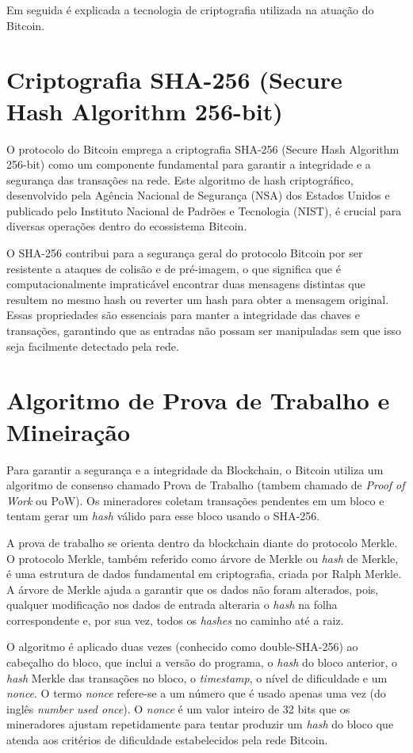 Em seguida é explicada a tecnologia de criptografia utilizada na atuação do Bitcoin.

\section*{Criptografia SHA-256 (Secure Hash Algorithm 256-bit)} \label{subsec:sha256}
O protocolo do Bitcoin emprega a criptografia SHA-256 (Secure Hash Algorithm 256-bit) como um componente fundamental para garantir a integridade e a segurança das transações na rede. Este algoritmo de hash criptográfico, desenvolvido pela Agência Nacional de Segurança (NSA) dos Estados Unidos e publicado pelo Instituto Nacional de Padrões e Tecnologia (NIST), é crucial para diversas operações dentro do ecossistema Bitcoin. 

O SHA-256 contribui para a segurança geral do protocolo Bitcoin por ser resistente a ataques de colisão e de pré-imagem, o que significa que é computacionalmente impraticável encontrar duas mensagens distintas que resultem no mesmo hash ou reverter um hash para obter a mensagem original. Essas propriedades são essenciais para manter a integridade das chaves e transações, garantindo que as entradas não possam ser manipuladas sem que isso seja facilmente detectado pela rede.

\section*{Algoritmo de Prova de Trabalho e Mineiração} \label{subsec:pow}
Para garantir a segurança e a integridade da Blockchain, o Bitcoin utiliza um algoritmo de consenso chamado Prova de Trabalho (tambem chamado de \textit{Proof of Work} ou PoW). Os mineradores coletam transações pendentes em um bloco e tentam gerar um \textit{hash} válido para esse bloco usando o SHA-256. 

A prova de trabalho se orienta dentro da blockchain diante do protocolo Merkle. O protocolo Merkle, também referido como árvore de Merkle ou \textit{hash} de Merkle, é uma estrutura de dados fundamental em criptografia, criada por Ralph Merkle. A árvore de Merkle ajuda a garantir que os dados não foram alterados, pois, qualquer modificação nos dados de entrada alteraria o \textit{hash} na folha correspondente e, por sua vez, todos os \textit{hashes} no caminho até a raiz.


O algoritmo é aplicado duas vezes (conhecido como double-SHA-256) ao cabeçalho do bloco, que inclui a versão do programa, o \textit{hash} do bloco anterior, o \textit{hash} Merkle das transações no bloco, o \textit{timestamp}, o nível de dificuldade e um \textit{nonce}. O termo \textit{nonce} refere-se a um número que é usado apenas uma vez (do inglês \textit{number used once}). O \textit{nonce} é um valor inteiro de 32 bits que os mineradores ajustam repetidamente para tentar produzir um \textit{hash} do bloco que atenda aos critérios de dificuldade estabelecidos pela rede Bitcoin.

